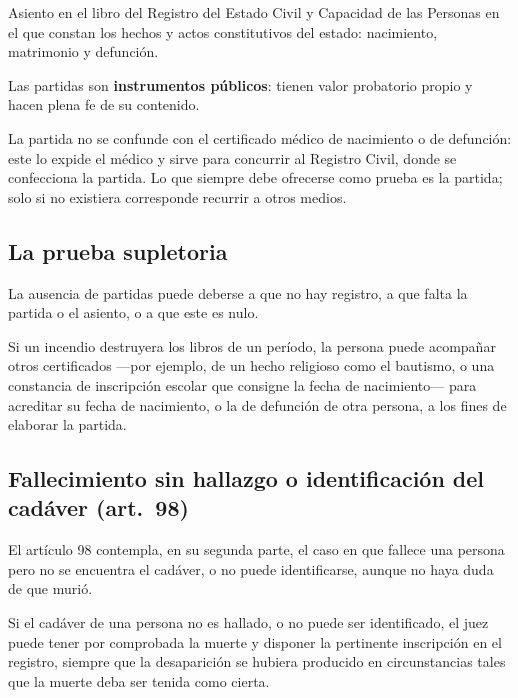 \documentclass[12pt,oneside]{book}
\begin{document}
\begin{definicion}[Partida]
Asiento en el libro del Registro del Estado Civil y Capacidad de las Personas en el que constan los hechos y actos constitutivos del estado: nacimiento, matrimonio y defunción.
\end{definicion}

\begin{importante}
Las partidas son \textbf{instrumentos públicos}: tienen valor probatorio propio y hacen plena fe de su contenido.
\end{importante}

\begin{nota}
La partida no se confunde con el certificado médico de nacimiento o de defunción: este lo expide el médico y sirve para concurrir al Registro Civil, donde se confecciona la partida. Lo que siempre debe ofrecerse como prueba es la partida; solo si no existiera corresponde recurrir a otros medios.
\end{nota}

\subsection{La prueba supletoria}

La ausencia de partidas puede deberse a que no hay registro, a que falta la partida o el asiento, o a que este es nulo.

\begin{ejemplo}
Si un incendio destruyera los libros de un período, la persona puede acompañar otros certificados ---por ejemplo, de un hecho religioso como el bautismo, o una constancia de inscripción escolar que consigne la fecha de nacimiento--- para acreditar su fecha de nacimiento, o la de defunción de otra persona, a los fines de elaborar la partida.
\end{ejemplo}

\subsection{Fallecimiento sin hallazgo o identificación del cadáver (art.~98)}

El artículo 98 contempla, en su segunda parte, el caso en que fallece una persona pero no se encuentra el cadáver, o no puede identificarse, aunque no haya duda de que murió.

\begin{regla}
Si el cadáver de una persona no es hallado, o no puede ser identificado, el juez puede tener por comprobada la muerte y disponer la pertinente inscripción en el registro, siempre que la desaparición se hubiera producido en circunstancias tales que la muerte deba ser tenida como cierta.
\end{regla}
\end{document}
